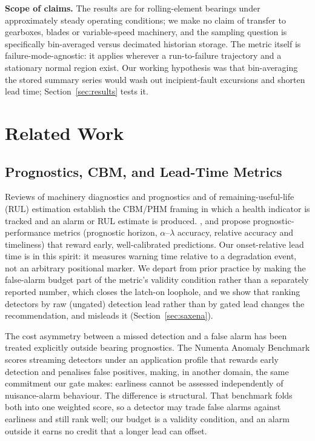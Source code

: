 \documentclass[IJPHM, 2026, 0]{PHMSociety}
\begin{document}
\textbf{Scope of claims.} The results are for rolling-element bearings under approximately steady operating conditions; we make no claim of transfer to gearboxes, blades or variable-speed machinery, and the sampling question is specifically bin-averaged versus decimated historian storage. The metric itself is failure-mode-agnostic: it applies wherever a run-to-failure trajectory and a stationary normal region exist. Our working hypothesis was that bin-averaging the stored summary series would wash out incipient-fault excursions and shorten lead time; Section~\ref{sec:results} tests it.

\section{Related Work}

\subsection{Prognostics, CBM, and Lead-Time Metrics}
Reviews of machinery diagnostics and prognostics \cite{jardine2006review,lee2014prognostics,lei2018machinery} and of remaining-useful-life (RUL) estimation \cite{si2011remaining} establish the CBM/PHM framing in which a health indicator is tracked and an alarm or RUL estimate is produced. ,  and  propose prognostic-performance metrics (prognostic horizon, $\alpha$--$\lambda$ accuracy, relative accuracy and timeliness) that reward early, well-calibrated predictions. Our onset-relative lead time is in this spirit: it measures warning time relative to a degradation event, not an arbitrary positional marker. We depart from prior practice by making the false-alarm budget part of the metric's validity condition rather than a separately reported number, which closes the latch-on loophole, and we show that ranking detectors by raw (ungated) detection lead rather than by gated lead changes the recommendation, and misleads it (Section~\ref{sec:saxena}).

The cost asymmetry between a missed detection and a false alarm has been treated explicitly outside bearing prognostics. The Numenta Anomaly Benchmark \cite{lavin2015nab} scores streaming detectors under an application profile that rewards early detection and penalises false positives, making, in another domain, the same commitment our gate makes: earliness cannot be assessed independently of nuisance-alarm behaviour. The difference is structural. That benchmark folds both into one weighted score, so a detector may trade false alarms against earliness and still rank well; our budget is a validity condition, and an alarm outside it earns no credit that a longer lead can offset.
\end{document}

